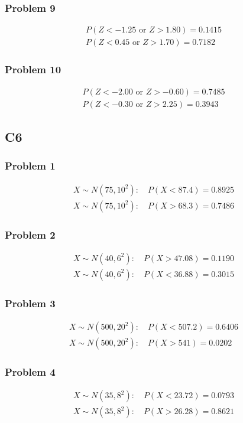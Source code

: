 \subsubsection{Problem 9}
\[
\begin{array}{l}
	P(Z<-1.25\text{ or }Z>1.80)=0.1415\\
	P(Z<0.45\text{ or }Z>1.70)=0.7182
\end{array}
\]

\subsubsection{Problem 10}
\[
\begin{array}{l}
	P(Z<-2.00\text{ or }Z>-0.60)=0.7485\\
	P(Z<-0.30\text{ or }Z>2.25)=0.3943
\end{array}
\]

\subsection{C6}

\subsubsection{Problem 1}
\[
\begin{array}{l}
	X\sim N(75,10^2):\quad P(X<87.4)=0.8925\\
	X\sim N(75,10^2):\quad P(X>68.3)=0.7486
\end{array}
\]

\subsubsection{Problem 2}
\[
\begin{array}{l}
	X\sim N(40,6^2):\quad P(X>47.08)=0.1190\\
	X\sim N(40,6^2):\quad P(X<36.88)=0.3015
\end{array}
\]

\subsubsection{Problem 3}
\[
\begin{array}{l}
	X\sim N(500,20^2):\quad P(X<507.2)=0.6406\\
	X\sim N(500,20^2):\quad P(X>541)=0.0202
\end{array}
\]

\subsubsection{Problem 4}
\[
\begin{array}{l}
	X\sim N(35,8^2):\quad P(X<23.72)=0.0793\\
	X\sim N(35,8^2):\quad P(X>26.28)=0.8621
\end{array}
\]

